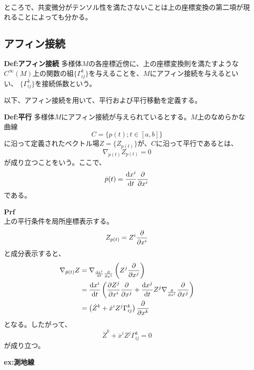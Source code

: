 \documentclass[a4paper,11pt]{jsarticle}
\numberwithin{equation}{section}
\begin{document}
ところで、共変微分がテンソル性を満たさないことは上の座標変換の第二項が現れることによっても分かる。

\subsection{アフィン接続}
\begin{itembox}[l]{\textbf{Def:アフィン接続}}
    多様体$M$の各座標近傍に、上の座標変換則を満たすような$C^\infty(M)$上の関数の組$\{\Gamma_{ij}^k\}$を与えることを、$M$にアフィン接続を与えるといい、
    $\{\Gamma_{ij}^k\}$を接続係数という。
\end{itembox}
以下、アフィン接続を用いて、平行および平行移動を定義する。
\begin{itembox}[l]{\textbf{Def:平行}}
    多様体$M$にアフィン接続が与えられているとする。$M$上のなめらかな曲線
    \begin{equation}
        C = \{p(t) ; t \in [a,b]\}
    \end{equation}
    に沿って定義されたベクトル場$Z=\{Z_{p(t)}\}$が、$C$に沿って平行であるとは、
    \begin{equation}
        \nabla_{\dot{p}(t)}Z_{p(t)} = 0
    \end{equation}
    が成り立つことをいう。ここで、
    \begin{equation}
        \dot{p}(t) = \dv{x^i}{t}\pdv{x^i}
    \end{equation}
    である。
\end{itembox}
\textbf{Prf}\\
上の平行条件を局所座標表示する。
\begin{equation}
    Z_{p(t)} = Z^i\pdv{x^i}
\end{equation}
と成分表示すると、
\begin{align}
    \nabla_{\dot{p}(t)}Z &= \nabla_{\dv{x^i}{t} \pdv{x^i}} \left( Z^j \pdv{x^j} \right) \\
    &= \dv{x^i}{t} \left( \pdv{Z^j}{x^i} \pdv{x^j} + \dv{x^j}{t} Z^j \nabla_{\pdv{x^i}} \pdv{x^j} \right) \\
    &= \left( \dot{Z}^k + \dot{x}^i Z^j \Gamma_{ij}^k \right) \pdv{x^k}
\end{align}
となる。したがって、
\begin{equation}
    \label{eq:parallel_condition}
    \dot{Z}^k + \dot{x}^iZ^j\Gamma_{ij}^k = 0
\end{equation}
が成り立つ。

\textbf{ex:測地線}\\
\end{document}
